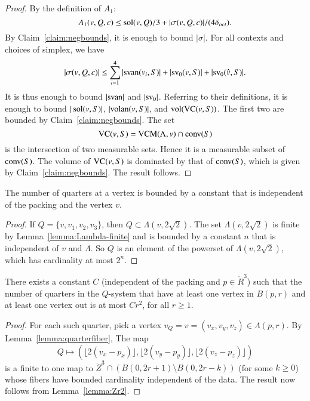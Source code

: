 \begin{proof} By the definition of $A_1$:
    $$
    A_1(v,Q,c) \le \operatorname{sol}(v,Q)/3 + |\sigma(v,Q,c)|/(4\delta_{oct}).
    $$
By Claim~\ref{claim:negbounds}, it is enough to bound $|\sigma|$.
For all contexts and choices of simplex, we have
    $$|\sigma(v,Q,c)|\le \sum_{i=1}^4 |{\operatorname{svan}}(v_i,S)| +
        |{\operatorname{sv}}_0(v,S)| 
      + |{\operatorname{sv}}_0(\hat v,S)|.
    $$
It is thus enough to bound $|{\operatorname{svan}}|$ and $|{\operatorname{sv}}_0|$.  Referring
to their definitions, it is enough to bound $|\operatorname{sol}(v,S)|$,
$|{\operatorname{volan}}(v,S)|$, and ${\operatorname{vol}}({\operatorname{VC}}(v,S))$. The first two
are bounded by Claim~\ref{claim:negbounds}.  The set
    $${\operatorname{VC}}(v,S) = {\operatorname{VCM}}(\Lambda,v)\cap {\operatorname{conv}}(S)$$
is the intersection of two measurable sets.  Hence it is a
measurable subset of ${\operatorname{conv}}(S)$.  The volume of ${\operatorname{VC}}(v,S)$ is
dominated by that of ${\operatorname{conv}}(S)$, which is given by
Claim~\ref{claim:negbounds}.  The result follows.
\end{proof}

\begin{lemma} \label{lemma:quarterfiber}
The number of quarters at a vertex is bounded by a constant that
is independent of the packing and the vertex $v$.
\end{lemma}

\begin{proof}  If $Q=\{v,v_1,v_2,v_3\}$, then $Q\subset
\Lambda(v,2\sqrt2)$.  The set $\Lambda(v,2\sqrt2)$ is finite by
Lemma~\ref{lemma:Lambda-finite} and is bounded by a constant $n$
that is independent of $v$ and $\Lambda$.  So $Q$ is an element of
the powerset of $\Lambda(v,2\sqrt2)$, which has cardinality at
most $2^n$.
\end{proof}

\begin{lemma}\label{lemma:qr2} There exists a constant $C$ (independent of the
packing and $p\in\ring{R}^3$) such that the number of
quarters in the $Q$-system that have at least one vertex in
$B(p,r)$ and at least one vertex out is at most $C r^2$, for all
$r\ge 1$.
\end{lemma}

\begin{proof}  For each such quarter, pick a vertex $v_Q=v=(v_x,v_y,v_z)\in
\Lambda(p,r)$.  By Lemma~\ref{lemma:quarterfiber}, The map
    $$
    Q\mapsto (\lfloor 2(v_x-p_x)\rfloor, \lfloor
    2(v_y-p_y)\rfloor,\lfloor 2(v_z-p_z)\rfloor)
    $$
is a finite to one map to $\ring{Z}^3 \cap ( B(0,2r+1) \setminus
B(0,2r-k))$ (for some $k\ge 0$) whose fibers have bounded
cardinality independent of the data.  The result now follows from
Lemma~\ref{lemma:Zr2}.
\end{proof}

